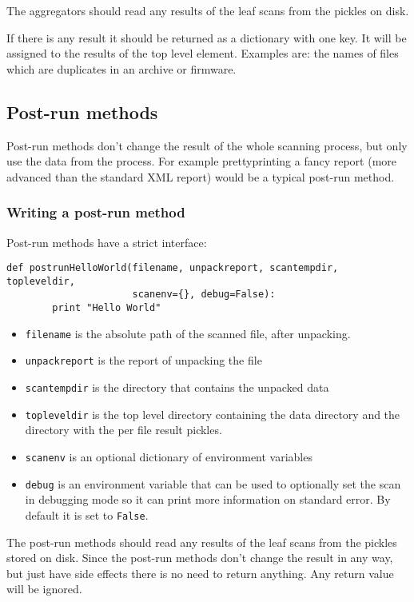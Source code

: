 \documentclass[10pt]{article}
\begin{document}
The aggregators should read any results of the leaf scans from the pickles
on disk.

If there is any result it should be returned as a dictionary with one key. It
will be assigned to the results of the top level element. Examples are: the
names of files which are duplicates in an archive or firmware.

\subsection{Post-run methods}

Post-run methods don't change the result of the whole scanning process, but
only use the data from the process. For example prettyprinting a fancy report
(more advanced than the standard XML report) would be a typical post-run
method.

\subsubsection{Writing a post-run method}

Post-run methods have a strict interface:

\begin{verbatim}
def postrunHelloWorld(filename, unpackreport, scantempdir, topleveldir,
                      scanenv={}, debug=False):
        print "Hello World"
\end{verbatim}

\begin{itemize}
\item \texttt{filename} is the absolute path of the scanned file, after
unpacking.
\item \texttt{unpackreport} is the report of unpacking the file
\item \texttt{scantempdir} is the directory that contains the unpacked data
\item \texttt{topleveldir} is the top level directory containing the data
directory and the directory with the per file result pickles.
\item \texttt{scanenv} is an optional dictionary of environment variables
\item \texttt{debug} is an environment variable that can be used to optionally
set the scan in debugging mode so it can print more information on standard
error. By default it is set to \texttt{False}.
\end{itemize}

The post-run methods should read any results of the leaf scans from the pickles
stored on disk. Since the post-run methods don't change the result in any way,
but just have side effects there is no need to return anything. Any return value
will be ignored.
\end{document}
